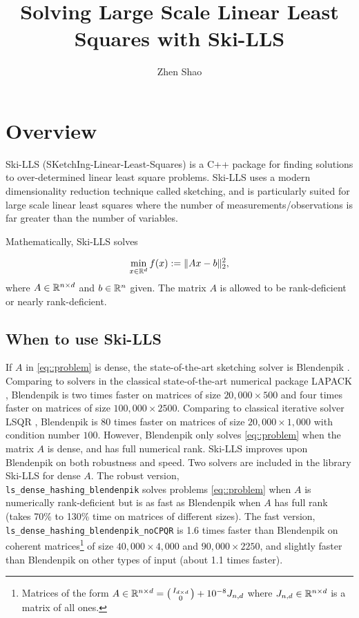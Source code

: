 \documentclass[english,11pt]{article}
\begin{document}
\title{Solving Large Scale Linear Least Squares with Ski-LLS}

\author{Zhen Shao}\maketitle

\section{Overview}

Ski-LLS (SKetchIng-Linear-Least-Squares) is a C++ package for finding solutions to over-determined linear least square problems. Ski-LLS uses a modern dimensionality reduction technique called sketching, and is particularly suited for large scale linear least squares where the number of measurements/observations is far greater than the number of variables. 

Mathematically, Ski-LLS solves

\begin{align}
\min_{x \in \mathbb{R}^{d}} f(x): = \|Ax - b\|_2^2, \label{eq::problem}
\end{align}
where $A \in \mathbb{R}^{n\times d}$ and $b \in \mathbb{R}^{n}$ given. The matrix $A$ is allowed to be rank-deficient or nearly rank-deficient. 

\subsection{When to use Ski-LLS}

If $A$ in \eqref{eq::problem} is dense, the state-of-the-art sketching solver is Blendenpik \cite{doi:10.1137/090767911}. Comparing to solvers in the classical state-of-the-art numerical package LAPACK \cite{laug}, Blendenpik is two times faster on matrices of size $20,000 \times 500$ and four times faster on matrices of size $100,000 \times 2500$. Comparing to classical iterative solver LSQR \cite{Paige:1982aa}, Blendenpik is 80 times faster on matrices of size $20,000 \times 1,000$ with condition number $100$. However, Blendenpik only solves \eqref{eq::problem} when the matrix $A$ is dense, and has full numerical rank. Ski-LLS improves upon Blendenpik on both robustness and speed. Two solvers are included in the library Ski-LLS for dense $A$. The robust version, \\{\tt ls_dense_hashing_blendenpik} solves problems \eqref{eq::problem} when $A$ is numerically rank-deficient but is as fast as Blendenpik when $A$ has full rank (takes 70\% to 130\% time on matrices of different sizes). The fast version, {\tt ls_dense_hashing_blendenpik_noCPQR} is 1.6 times faster than Blendenpik on coherent matrices\footnote{Matrices of the form $A \in \mathbb{R}^{n\times d} = \bigl(\begin{smallmatrix} I_{d\times d} \\ 0  \end{smallmatrix}\bigr) + 10^{-8}J_{n,d} $ where $J_{n,d} \in \mathbb{R}^{n \times d}$ is a matrix of all ones.} of size $40,000 \times 4,000$ and $90,000 \times 2250$, and slightly faster than Blendenpik on other types of input (about 1.1 times faster).
\end{document}
